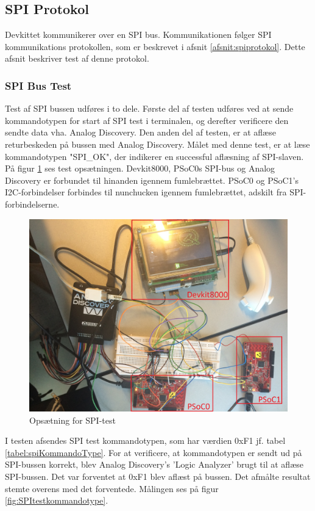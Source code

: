 \subsection{SPI Protokol}
Devkittet kommunikerer over en SPI bus. Kommunikationen følger SPI kommunikations protokollen, som er beskrevet i afsnit \ref{afsnit:spiprotokol}. Dette afsnit beskriver test af denne protokol.

\subsubsection{SPI Bus Test}
Test af SPI bussen udføres i to dele. Første del af testen udføres ved at sende kommandotypen for start af SPI test i terminalen, og derefter verificere den sendte data vha. Analog Discovery. Den anden del af testen, er at aflæse returbeskeden på bussen med Analog Discovery. Målet med denne test, er at læse kommandotypen "SPI\_OK", der indikerer en successful aflæsning af SPI-slaven.  På figur \ref{figure:SpiTestSetup} ses test opsætningen. Devkit8000, PSoC0s SPI-bus og Analog Discovery  er forbundet til hinanden igennem fumlebrættet. PSoC0 og PSoC1's I2C-forbindelser forbindes til nunchucken igennem fumlebrættet, adskilt fra SPI-forbindelserne.


\begin{figure}[H]
	\centering
	\includegraphics[width=\textwidth]{Test/images/SPItest/SpiTestSetup}
	\caption{Opsætning for SPI-test}
	\label{figure:SpiTestSetup}
\end{figure}


I testen afsendes SPI test kommandotypen, som har værdien 0xF1 jf. tabel \ref{tabel:spiKommandoType}. For at verificere, at kommandotypen er sendt ud på SPI-bussen korrekt, blev Analog Discovery's 'Logic Analyzer' brugt til at aflæse SPI-bussen. Det var forventet at 0xF1 blev aflæst på bussen. Det afmålte resultat stemte overens med det forventede. Målingen ses på figur \ref{fig:SPItestkommandotype}. 

